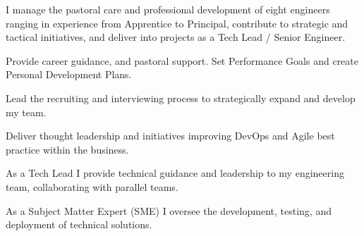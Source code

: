 I manage the pastoral care and professional development of eight engineers ranging in experience from Apprentice to Principal, contribute to strategic and tactical initiatives, and deliver into projects as a Tech Lead / Senior Engineer.
\vspace{0.25em}
\begin{tightemize}
  \item Provide career guidance, and pastoral support. Set Performance Goals and create Personal Development Plans.
  \item Lead the recruiting and interviewing process to strategically expand and develop my team.
  \item Deliver thought leadership and initiatives improving DevOps and Agile best practice within the business.
  \item As a Tech Lead I provide technical guidance and leadership to my engineering team, collaborating with parallel teams.
  \item As a Subject Matter Expert (SME) I oversee the development, testing, and deployment of technical solutions.
\end{tightemize}
\sectionsep{}
\vfill{}